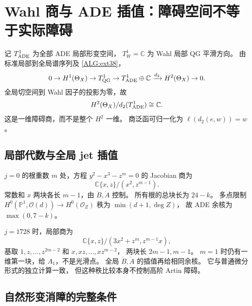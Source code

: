 \documentclass[UTF8,fontset=fandol,zihao=-4,oneside,openany]{ctexbook}
\theoremstyle{cjkplain}
\numberwithin{equation}{chapter}
\begin{document}
\section{Wahl 商与 ADE 插值：障碍空间不等于实际障碍}

记 $T^1_{\rm ADE}$ 为全部 ADE 局部形变空间，
$T^1_W=\mathbb C$ 为 Wahl 局部 QG 平滑方向。
由标准局部到全局谱序列及 \eqref{ALG:ext38}，
\begin{equation}
0\to H^1(\Theta_X)\to T^1_{\rm QG}
\to T^1_{\rm ADE}\oplus\mathbb C
\xrightarrow{d_2}H^2(\Theta_X)\to0.
\label{ALG:localglobal}
\end{equation}
全局切空间到 Wahl 因子的投影为零，故
\begin{equation}
H^2(\Theta_X)/d_2(T^1_{\rm ADE})\cong\mathbb C.
\label{ALG:wahlquotient}
\end{equation}
这是一维障碍商，而不是整个 $H^2$ 一维。
商泛函可归一化为 $\ell(d_2(e,w))=w$。

\subsection{局部代数与全局 jet 插值}

$j=0$ 的根重数 $m$ 处，方程 $y^2-x^3-z^m=0$ 的 Jacobian 商为
\[
\mathbb C\{x,z\}/(x^2,z^{m-1}).
\]
常数和 $x$ 两块各长 $m-1$，由 $\dot B,\dot A$ 控制。
所有根的总块长为 $24-k$。
多点限制
$H^0(\mathbb P^1,\mathcal O(d))\to H^0(\mathcal O_Z)$
秩为 $\min(d+1,\deg Z)$，
故 ADE 余核为 $\max(0,7-k)$。

$j=1728$ 时，局部商为
\[
\mathbb C\{x,z\}/(3x^2+z^m,z^{m-1}x),
\]
基取
$1,z,\ldots,z^{2m-2}$ 和 $x,xz,\ldots,xz^{m-2}$，
两块长 $2m-1,m-1$。
$m=1$ 时仍有一维第一块，给 $A_1$，不是光滑点。
全局 $\dot B,\dot A$ 的插值再给相同余核。
它与普通微分形式的独立计算一致，
但这种秩比较本身不控制高阶 Artin 障碍。

\subsection{自然形变消障的完整条件}
\end{document}
